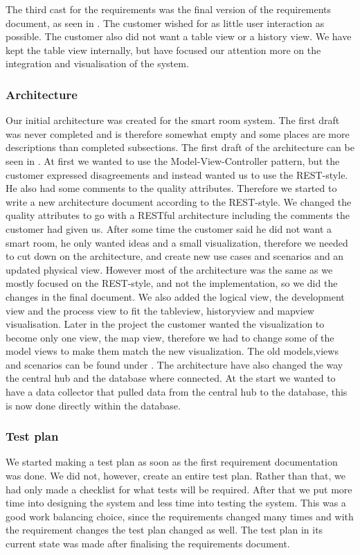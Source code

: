 \documentclass[../document.tex]{subfiles}
\begin{document}
The third cast for the requirements was the final version of the requirements document, as seen in . The customer wished for as little user interaction as possible. The customer also did not want a table view or a history view. We have kept the table view internally, but have focused our attention more on the integration and visualisation of the system.

\subsubsection{Architecture}
Our initial architecture was created for the smart room system. The first draft was never completed and is therefore somewhat empty and some places are more descriptions than completed subsections. The first draft of the architecture can be seen in . At first we wanted to use the Model-View-Controller pattern, but the customer expressed disagreements and instead wanted us to use the REST-style. He also had some comments to the quality attributes. Therefore we started to write a new architecture document according to the REST-style. We changed the quality attributes to go with a RESTful architecture including the comments the customer had given us. After some time the customer said he did not want a smart room, he only wanted ideas and a small visualization, therefore we needed to cut down on the architecture, and create new use cases and scenarios and an updated physical view. However most of the architecture was the same as we mostly focused on the REST-style, and not the implementation, so we did the changes in the final document. We also added the logical view, the development view and the process view to fit the tableview, historyview and mapview visualisation. Later in the project the customer wanted the visualization to become only one view, the map view, therefore we had to change some of the model views to make them match the new visualization. The old models,views and scenarios can be found under . The architecture have also changed the way the central hub and the database where connected. At the start we wanted to have a data collector that pulled data from the central hub to the database, this is now done directly within the database.

\subsubsection{Test plan}
We started making a test plan as soon as the first requirement documentation was done. We did not, however, create an entire test plan. Rather than that, we had only made a checklist for what tests will be required. After that we put more time into designing the system and less time into testing the system. This was a good work balancing choice, since the requirements changed many times and with the requirement changes the test plan changed as well. The test plan in its current state was made after finalising the requirements document.
\end{document}
